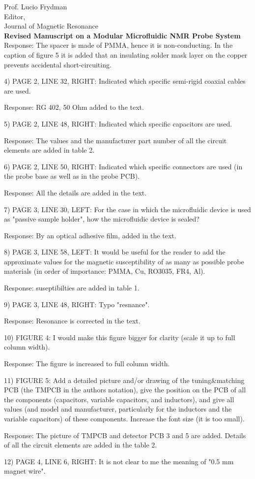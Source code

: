 \documentclass{mu-soton-letter}
\begin{document}
\begin{letter}{Prof. Lucio Frydman\\
  Editor,\\
  Journal of Magnetic Resonance\\[2cm]
  \textbf{Revised Manuscript on a Modular Microfluidic NMR Probe System}}
Response: The spacer is made of PMMA, hence it is non-conducting. In the caption of figure 5 it is added that an insulating solder mask layer on the copper prevents accidental short-circuiting.

4) PAGE 2, LINE 32, RIGHT: Indicated which specific semi-rigid coaxial cables are used.

Response: RG 402, 50 Ohm added to the text.

5) PAGE 2, LINE 48, RIGHT: Indicated which specific capacitors are used.

Response: The values and the manufacturer part number of all the circuit elements are added in table 2.

6) PAGE 2, LINE 50, RIGHT: Indicated which specific connectors are used (in the probe base as well as in the probe PCB).

Response: All the details are added in the text.

7) PAGE 3, LINE 30, LEFT: For the case in which the microfluidic device is used as "passive sample holder", how the microfluidic device is sealed?

Response: By an optical adhesive film, added in the text.


8) PAGE 3, LINE 58, LEFT: It would be useful for the reader to add the approximate values for the magnetic susceptibility of as many as possible probe materials (in order of importance: PMMA, Cu, RO3035, FR4, Al).

Response: suseptibilties are added in table 1.

9) PAGE 3, LINE 48, RIGHT: Typo "resnance".

Response: Resonance is corrected in the text.

10) FIGURE 4: I would make this figure bigger for clarity (scale it up to full column width).

Response:  The figure is increased to full column width.

11) FIGURE 5: Add a detailed picture and/or drawing of the tuning&matching PCB (the TMPCB in the authors notation), give the position on the PCB of all the components (capacitors, variable capacitors, and inductors), and give all values (and model and manufacturer, particularly for the inductors and the variable capacitors) of these components. Increase the font size (it is too small).

Response: The picture of TMPCB and detector PCB 3 and 5 are added. Details of all the circuit elements are added in the table 2.

12) PAGE 4, LINE 6, RIGHT: It is not clear to me the meaning of "0.5 mm magnet wire".


\end{letter}
\end{document}
